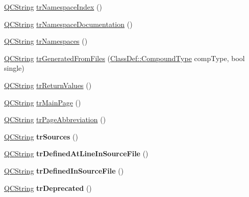 \begin{DoxyCompactItemize}
\item 
\mbox{\hyperlink{class_q_c_string}{Q\+C\+String}} \mbox{\hyperlink{class_translator_polish_a0502d51337eb975b337ae7ec579fd23d}{tr\+Namespace\+Index}} ()
\item 
\mbox{\hyperlink{class_q_c_string}{Q\+C\+String}} \mbox{\hyperlink{class_translator_polish_a841e96dec3b0c1f25eb120cfec6acba3}{tr\+Namespace\+Documentation}} ()
\item 
\mbox{\hyperlink{class_q_c_string}{Q\+C\+String}} \mbox{\hyperlink{class_translator_polish_ac4d9d7b38ecf2340250c574e3982b4c1}{tr\+Namespaces}} ()
\item 
\mbox{\hyperlink{class_q_c_string}{Q\+C\+String}} \mbox{\hyperlink{class_translator_polish_abe9db80c7167df1755c7e58f6f2dcfb6}{tr\+Generated\+From\+Files}} (\mbox{\hyperlink{class_class_def_ae70cf86d35fe954a94c566fbcfc87939}{Class\+Def\+::\+Compound\+Type}} comp\+Type, bool single)
\item 
\mbox{\hyperlink{class_q_c_string}{Q\+C\+String}} \mbox{\hyperlink{class_translator_polish_a64ed3d915abcab0248d06de14478c910}{tr\+Return\+Values}} ()
\item 
\mbox{\hyperlink{class_q_c_string}{Q\+C\+String}} \mbox{\hyperlink{class_translator_polish_a033eef7792589d29b8a22048d6181a25}{tr\+Main\+Page}} ()
\item 
\mbox{\hyperlink{class_q_c_string}{Q\+C\+String}} \mbox{\hyperlink{class_translator_polish_a1ab1467678c57a72f34102a46c9f1b98}{tr\+Page\+Abbreviation}} ()
\item 
\mbox{\label{class_translator_polish_abe9630260a7a927510929ae1e2fe5be2}} 
\mbox{\hyperlink{class_q_c_string}{Q\+C\+String}} {\bfseries tr\+Sources} ()
\item 
\mbox{\label{class_translator_polish_ad83d6e77bfb1873911f888cc35ee54d8}} 
\mbox{\hyperlink{class_q_c_string}{Q\+C\+String}} {\bfseries tr\+Defined\+At\+Line\+In\+Source\+File} ()
\item 
\mbox{\label{class_translator_polish_ad3838577d88a92b7a40bae9724da5830}} 
\mbox{\hyperlink{class_q_c_string}{Q\+C\+String}} {\bfseries tr\+Defined\+In\+Source\+File} ()
\item 
\mbox{\label{class_translator_polish_ae3de06da645c6f37444d330b80445f90}} 
\mbox{\hyperlink{class_q_c_string}{Q\+C\+String}} {\bfseries tr\+Deprecated} ()

\end{DoxyCompactItemize}
